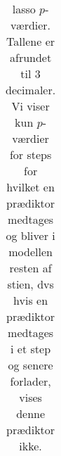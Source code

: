 \begin{table}[ht]
\begin{tabular}{llll}
\bottomrule
\end{tabular}  
\caption{lasso \(p\)-værdier.
Tallene er afrundet til 3 decimaler.
Vi viser kun \(p\)-værdier for steps for hvilket en prædiktor medtages og bliver i modellen resten af stien, dvs hvis en prædiktor medtages i et step og senere forlader, vises denne prædiktor ikke.}
\end{table} 